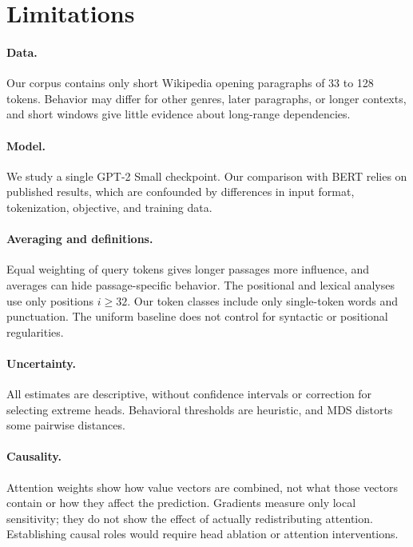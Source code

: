 \documentclass{article}
\begin{document}
\section{Limitations}
\label{sec:limitations}

\paragraph{Data.} Our corpus contains only short Wikipedia opening paragraphs of 33 to 128 tokens. Behavior may differ for other genres, later paragraphs, or longer contexts, and short windows give little evidence about long-range dependencies.

\paragraph{Model.} We study a single GPT-2 Small checkpoint. Our comparison with BERT relies on published results, which are confounded by differences in input format, tokenization, objective, and training data.

\paragraph{Averaging and definitions.} Equal weighting of query tokens gives longer passages more influence, and averages can hide passage-specific behavior. The positional and lexical analyses use only positions $i\geq32$. Our token classes include only single-token words and punctuation. The uniform baseline does not control for syntactic or positional regularities.

\paragraph{Uncertainty.} All estimates are descriptive, without confidence intervals or correction for selecting extreme heads. Behavioral thresholds are heuristic, and MDS distorts some pairwise distances.

\paragraph{Causality.} Attention weights show how value vectors are combined, not what those vectors contain or how they affect the prediction. Gradients measure only local sensitivity; they do not show the effect of actually redistributing attention. Establishing causal roles would require head ablation \citep{michel2019} or attention interventions.
\end{document}
